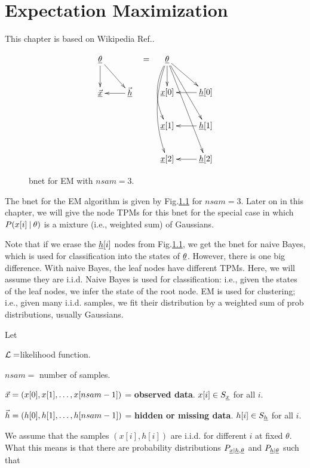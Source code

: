 \chapter{Expectation Maximization}

This chapter is based on Wikipedia 
Ref.\cite{wiki-em}.


\begin{figure}[h!]
\centering
$$\begin{array}{ccc}
\xymatrix{
\ul{\theta}\ar[d]\ar[dr]
\\
\ul{\vecx}&\ul{\vech}\ar[l]
}
&=&
\xymatrix{
\ul{\theta}
\ar[d]
\ar@/_1pc/[dd]
\ar@/_1pc/[ddd]
\ar[rd]\ar[rdd]\ar[rddd]
\\
\rvx[0]
&\rvh[0]\ar[l]
\\
\rvx[1]
&\rvh[1]\ar[l]
\\
\rvx[2]
&\rvh[2]\ar[l]
}
\end{array}
$$
\caption{bnet for EM with $nsam=3$.}
\label{fig-em-bnet}
\end{figure}


The bnet for the EM algorithm
is given by Fig.\ref{fig-em-bnet}
for $nsam=3$.
Later on in this chapter,
we will give the node TPMs
for this bnet for
the special
case in which $P(x[i]{\:\mathbf{|}\:} \theta)$
is a mixture (i.e., weighted sum)
of Gaussians.

Note that if we 
erase the ${\underline{h}}[i]$ nodes
from Fig.\ref{fig-em-bnet},
we get the bnet for naive Bayes,
which is used for classification
into the states of $\underline{\theta}$.
However, there is one big
difference. 
With naive Bayes,
the leaf nodes have
different TPMs.
Here, we will assume they are i.i.d.
Naive Bayes is used for classification: i.e., 
given the states 
of the leaf nodes,
we infer the state of the root node.
EM is used for clustering; i.e.,
given many i.i.d. samples,
we fit their distribution by a weighted sum
of prob distributions,
usually Gaussians.

Let
 
${\cal L}=$likelihood 
function.

$nsam=$ number of samples.

${\vec{x}}=(x[0], x[1], \ldots, x[nsam-1])$ =
{\bf observed data}.
 $x[i]\in S_{\underline{x}}$ for all $i$.

${\vec{h}}=(h[0], h[1], \ldots, h[nsam-1])$
= {\bf hidden or missing data}.
$h[i]\in S_{\underline{h}}$ for all $i$.

We assume that the samples $(x[i],h[i])$
are i.i.d. for different $i$ at fixed 
$\theta$.
What this means is that 
there are
probability distributions
$P_{{\underline{x}}|{\underline{h}},\underline{\theta}}$
and $P_{{\underline{h}}|\underline{\theta}}$
such that

